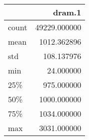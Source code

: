 \begin{tabular}{lr}
\toprule
{} &        dram.1 \\
\midrule
count &  49229.000000 \\
mean  &   1012.362896 \\
std   &    108.137976 \\
min   &     24.000000 \\
25\%   &    975.000000 \\
50\%   &   1000.000000 \\
75\%   &   1034.000000 \\
max   &   3031.000000 \\
\bottomrule
\end{tabular}
